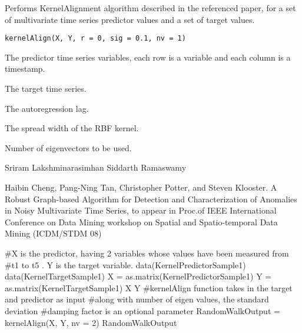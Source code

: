 \begin{Description}\relax
Performs KernelAlignment algorithm described in the referenced paper, for a set of multivariate time series predictor values and a set of target values.
\end{Description}
\begin{Usage}
\begin{verbatim}
kernelAlign(X, Y, r = 0, sig = 0.1, nv = 1)
\end{verbatim}
\end{Usage}
\begin{Arguments}
\begin{ldescription}
\item[\code{X}] The predictor time series variables, each row is a variable and each column is a timestamp.

\item[\code{Y}] The target time series.

\item[\code{r}] The autoregression lag.

\item[\code{sig}] The spread width of the RBF kernel.

\item[\code{nv}] Number of eigenvectors to be used.

\end{ldescription}
\end{Arguments}
\begin{Author}\relax
Sriram Lakshminarasimhan
Siddarth Ramaswamy
\end{Author}
\begin{References}\relax
[1] Haibin Cheng, Pang-Ning Tan, Christopher Potter, and Steven Klooster. 
A Robust Graph-based Algorithm for Detection and Characterization of Anomalies in Noisy
Multivariate Time Series, to appear in Proc.of IEEE International Conference on Data Mining
workshop on Spatial and Spatio-temporal Data Mining (ICDM/STDM 08)
\end{References}
\begin{Examples}
\begin{ExampleCode}
#X is the predictor, having 2 variables whose values have been measured from
#t1 to t5 . Y is the target variable.
data(KernelPredictorSample1)
data(KernelTargetSample1)
X = as.matrix(KernelPredictorSample1)
Y = as.matrix(KernelTargetSample1)
X
Y
#kernelAlign function takes in the target and predictor as input
#along with number of eigen values, the standard deviation
#damping factor is an optional parameter
RandomWalkOutput = kernelAlign(X, Y, nv = 2)
RandomWalkOutput
\end{ExampleCode}
\end{Examples}

